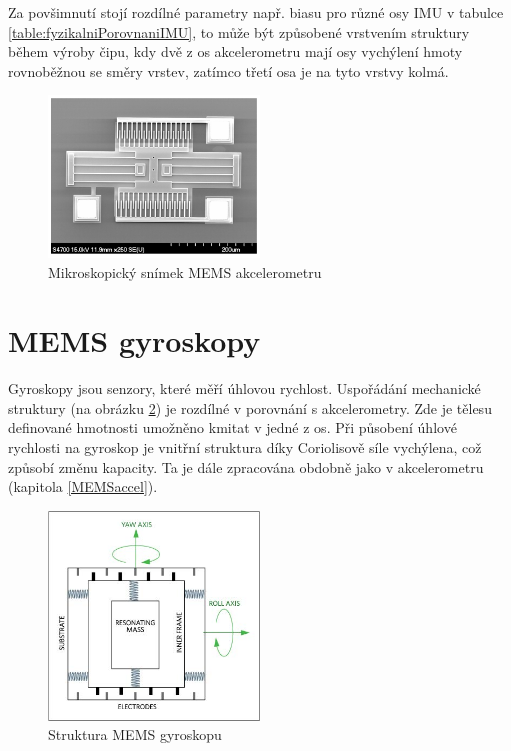 Za povšimnutí stojí rozdílné parametry např. biasu pro různé osy \ac{IMU} v tabulce \ref{table:fyzikalniPorovnaniIMU}, to může být způsobené vrstvením struktury během výroby čipu, kdy dvě z os akcelerometru mají osy vychýlení hmoty rovnoběžnou se směry vrstev, zatímco třetí osa je na tyto vrstvy kolmá.

\begin{figure}[h]
    \centering
    \includegraphics[width=0.5\textwidth]{obrazky/MEMSaccelerometerPhoto}
    \caption{Mikroskopický snímek MEMS akcelerometru \cite{cCumN04KaPNjERaF}}
    \label{fig:MEMSaccelerometerPhoto}
\end{figure}

\section{MEMS gyroskopy}
Gyroskopy jsou senzory, které měří úhlovou rychlost. Uspořádání mechanické struktury (na obrázku \ref{fig:MEMSgyroscope}) je rozdílné v porovnání s akcelerometry. Zde je tělesu definované hmotnosti umožněno kmitat v jedné z os. Při působení úhlové rychlosti na gyroskop je vnitřní struktura díky Coriolisově síle vychýlena, což způsobí změnu kapacity. Ta je dále zpracována obdobně jako v akcelerometru (kapitola \ref{MEMSaccel}). \cite{Tittertonc2004} \cite{Dadafshar2014}
\begin{figure}[h]
    \centering
    \includegraphics[width=0.5\textwidth]{obrazky/MEMSgyroscope}
    \caption{Struktura MEMS gyroskopu \cite{Dadafshar2014}}
    \label{fig:MEMSgyroscope}
\end{figure}

